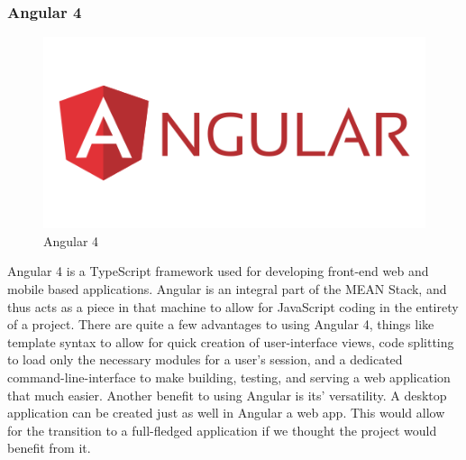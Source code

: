 \documentclass[12pt,a4paper]{report}
\begin{document}
			\subsubsection{Angular 4}
			\begin{figure}
				\includegraphics[scale=.3]{angular_4}
				\caption{Angular 4}
				\label{fig: Angular 4}
			\end{figure}
			Angular 4 is a TypeScript framework used for developing front-end web and mobile based applications. Angular is an integral part of the MEAN Stack, and thus acts as a piece in that machine to allow for JavaScript coding in the entirety of a project. There are quite a few advantages to using Angular 4, things like template syntax to allow for quick creation of user-interface views, code splitting to load only the necessary modules for a user's session, and a dedicated command-line-interface to make building, testing, and serving a web application that much easier. Another benefit to using Angular is its' versatility. A desktop application can be created just as well in Angular a web app. This would allow for the transition to a full-fledged application if we thought the project would benefit from it. \cite{angular}
			
			\newpage
\end{document}
